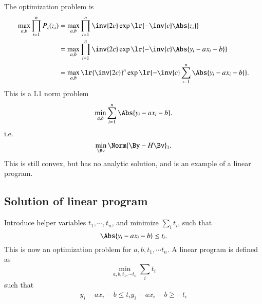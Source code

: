 The optimization problem is
\begin{equation}\label{eqn:L1introduction:480}
\begin{aligned}
\max_{a,b} \prod_{i = 1}^n P_z(z_i)
&= \max_{a,b} \prod_{i = 1}^n \inv{2 c} \exp\lr{ -\inv{c} \Abs{z_i} } \\
&= \max_{a,b} \prod_{i = 1}^n \inv{2 c} \exp\lr{ -\inv{c} \Abs{y_i - a x_i - b} } \\
&= \max_{a,b} \lr{\inv{2 c}}^n \exp\lr{ -\inv{c} \sum_{i=1}^n \Abs{y_i - a x_i - b} }.
\end{aligned}
\end{equation}
%
This is a L1 norm problem
\begin{equation}\label{eqn:L1introduction:500}
\min_{a,b} \sum_{i = 1}^n \Abs{ y_i - a x_i - b }.
\end{equation}
%
i.e.
%
\begin{equation}\label{eqn:L1introduction:520}
\min_\Bv \Norm{ \By - H \Bv }_1.
\end{equation}
%
This is still convex, but has no analytic solution, and is an example of a linear program.
\subsection{Solution of linear program}
Introduce helper variables \( t_1, \cdots, t_n \), and
minimize \( \sum_i t_i \), such that
\begin{equation}\label{eqn:L1introduction:540}
\Abs{ y_i - a x_i - b } \le t_i.
\end{equation}
This is now an optimization problem for \( a, b, t_1, \cdots t_n \).  A linear program is defined as
\begin{equation}\label{eqn:L1introduction:560}
\min_{a, b, t_1, \cdots t_n} \sum_i t_i
\end{equation}
such that
\begin{equation}\label{eqn:L1introduction:580}
\begin{aligned}
y_i - a x_i - b \le t_i
y_i - a x_i - b \ge -t_i
\end{aligned}
\end{equation}
